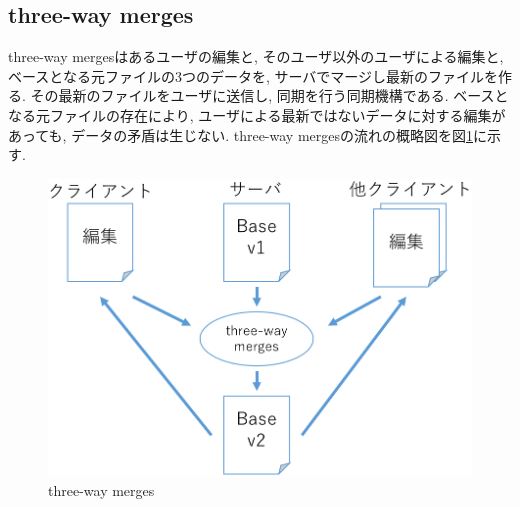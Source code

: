 \subsection{three-way merges}
three-way mergesはあるユーザの編集と, そのユーザ以外のユーザによる編集と, ベースとなる元ファイルの3つのデータを, サーバでマージし最新のファイルを作る. その最新のファイルをユーザに送信し, 同期を行う同期機構である. ベースとなる元ファイルの存在により, ユーザによる最新ではないデータに対する編集があっても, データの矛盾は生じない.
three-way mergesの流れの概略図を図\ref{threeway}に示す.
\begin{figure}[htbp]
  \begin{center}
    \includegraphics[scale=0.3]{images/threeway}
    \caption{three-way merges}
    \label{threeway}
  \end{center}
\end{figure}
%

